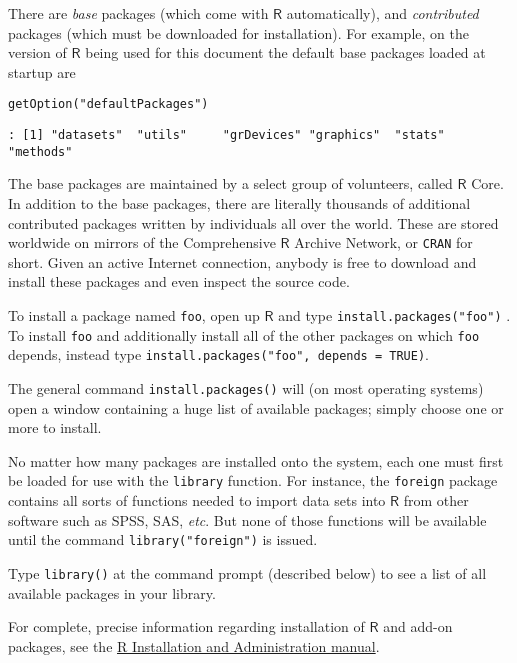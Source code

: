 There are \emph{base} packages (which come with \(\mathsf{R}\)
automatically), and \emph{contributed} packages (which must be downloaded
for installation). For example, on the version of \(\mathsf{R}\) being
used for this document the default base packages loaded at startup are

\begin{verbatim}
getOption("defaultPackages")
\end{verbatim}

\begin{verbatim}
: [1] "datasets"  "utils"     "grDevices" "graphics"  "stats"     "methods"
\end{verbatim}

The base packages are maintained by a select group of volunteers,
called \(\mathsf{R}\) Core. In addition to the base packages, there
are literally thousands of additional contributed packages written by
individuals all over the world. These are stored worldwide on mirrors
of the Comprehensive \(\mathsf{R}\) Archive Network, or \texttt{CRAN} for
short. Given an active Internet connection, anybody is free to
download and install these packages and even inspect the source code.

To install a package named \texttt{foo}, open up \(\mathsf{R}\) and type
\texttt{install.packages("foo")}
. To
install \texttt{foo} and additionally install all of the other packages on
which \texttt{foo} depends, instead type \texttt{install.packages("foo", depends =
TRUE)}.

The general command \texttt{install.packages()} will (on most operating
systems) open a window containing a huge list of available packages;
simply choose one or more to install.

No matter how many packages are installed onto the system, each one
must first be loaded for use with the
\texttt{library}  function. For instance, the
\texttt{foreign} package \cite{foreign} contains all sorts of functions
needed to import data sets into \(\mathsf{R}\) from other software
such as SPSS, SAS, \emph{etc}. But none of those functions will be
available until the command \texttt{library("foreign")} is issued.

Type \texttt{library()} at the command prompt (described below) to see a list
of all available packages in your library.

For complete, precise information regarding installation of
\(\mathsf{R}\) and add-on packages, see the \href{http://cran.r-project.org/manuals.html}{R Installation and Administration manual}.

